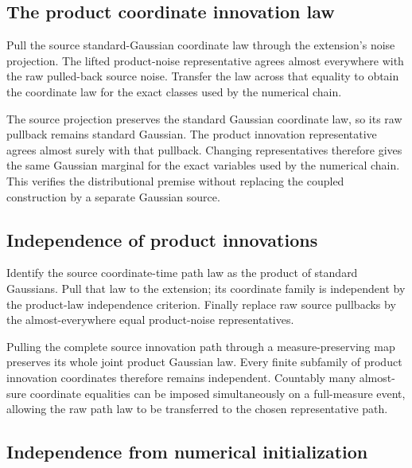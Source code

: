 \documentclass[11pt,a4paper]{article}
\begin{document}
\subsection{\texorpdfstring{The product coordinate innovation law}{The product coordinate innovation law}}


Pull the source standard-Gaussian coordinate law through the extension's noise projection. The lifted product-noise representative agrees almost everywhere with the raw pulled-back source noise. Transfer the law across that equality to obtain the coordinate law for the exact classes used by the numerical chain.



The source projection preserves the standard Gaussian coordinate law, so its raw pullback remains standard Gaussian. The product innovation representative agrees almost surely with that pullback. Changing representatives therefore gives the same Gaussian marginal for the exact variables used by the numerical chain. This verifies the distributional premise without replacing the coupled construction by a separate Gaussian source.


\subsection{\texorpdfstring{Independence of product innovations}{Independence of product innovations}}


Identify the source coordinate-time path law as the product of standard Gaussians. Pull that law to the extension; its coordinate family is independent by the product-law independence criterion. Finally replace raw source pullbacks by the almost-everywhere equal product-noise representatives.



Pulling the complete source innovation path through a measure-preserving map preserves its whole joint product Gaussian law. Every finite subfamily of product innovation coordinates therefore remains independent. Countably many almost-sure coordinate equalities can be imposed simultaneously on a full-measure event, allowing the raw path law to be transferred to the chosen representative path.


\subsection{\texorpdfstring{Independence from numerical initialization}{Independence from numerical initialization}}
\end{document}

